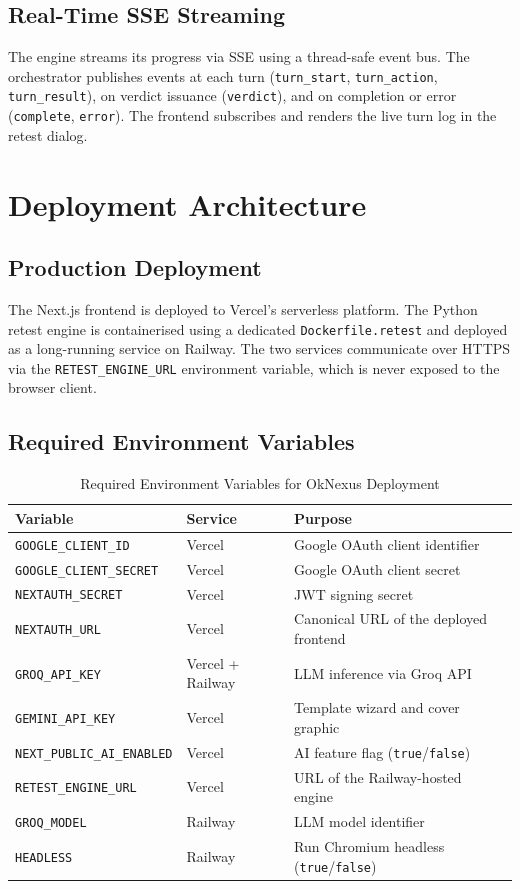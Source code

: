 \subsection{Real-Time SSE Streaming}

The engine streams its progress via SSE using a thread-safe event bus. The orchestrator publishes events at each turn (\texttt{turn\_start}, \texttt{turn\_action}, \texttt{turn\_result}), on verdict issuance (\texttt{verdict}), and on completion or error (\texttt{complete}, \texttt{error}). The frontend subscribes and renders the live turn log in the retest dialog.

\section{Deployment Architecture}

\subsection{Production Deployment}

The Next.js frontend is deployed to Vercel's serverless platform. The Python retest engine is containerised using a dedicated \texttt{Dockerfile.retest} and deployed as a long-running service on Railway. The two services communicate over HTTPS via the \texttt{RETEST\_ENGINE\_URL} environment variable, which is never exposed to the browser client.

\subsection{Required Environment Variables}

\begin{table}[h!]
\centering
\caption{Required Environment Variables for OkNexus Deployment}
\label{tab:env_vars}
\begin{tabular}{|l|l|p{5cm}|}
\hline
\textbf{Variable} & \textbf{Service} & \textbf{Purpose} \\
\hline
\texttt{GOOGLE\_CLIENT\_ID} & Vercel & Google OAuth client identifier \\
\texttt{GOOGLE\_CLIENT\_SECRET} & Vercel & Google OAuth client secret \\
\texttt{NEXTAUTH\_SECRET} & Vercel & JWT signing secret \\
\texttt{NEXTAUTH\_URL} & Vercel & Canonical URL of the deployed frontend \\
\texttt{GROQ\_API\_KEY} & Vercel + Railway & LLM inference via Groq API \\
\texttt{GEMINI\_API\_KEY} & Vercel & Template wizard and cover graphic \\
\texttt{NEXT\_PUBLIC\_AI\_ENABLED} & Vercel & AI feature flag (\texttt{true}/\texttt{false}) \\
\texttt{RETEST\_ENGINE\_URL} & Vercel & URL of the Railway-hosted engine \\
\texttt{GROQ\_MODEL} & Railway & LLM model identifier \\
\texttt{HEADLESS} & Railway & Run Chromium headless (\texttt{true}/\texttt{false}) \\
\hline
\end{tabular}
\end{table}

